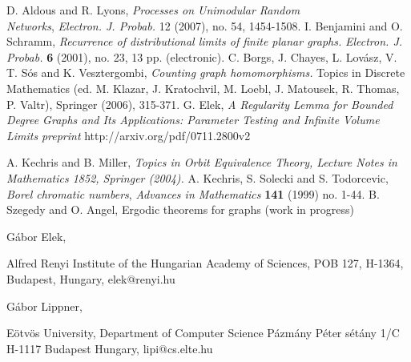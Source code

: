 \documentclass{article}
\begin{document}
\begin{thebibliography}{99} 
 {\sc D. Aldous and R. Lyons}, {\em 
Processes on Unimodular Random \\
Networks}, {\sl  Electron. J. Probab.}  12  (2007), no. 54, 1454-1508.
 {\sc I. Benjamini and O. Schramm},
{\em Recurrence of distributional limits of finite planar graphs.}
{\sl Electron. J. Probab.} {\bf 6} (2001), no. 23, 13 pp. (electronic).
 {\sc C. Borgs, J. Chayes, L. Lov\'asz, V. T. S\'os and
K. Vesztergombi},
{\em Counting graph homomorphisms.}
 Topics in Discrete Mathematics  (ed. M. Klazar, J. Kratochvil, M. Loebl, 
J. Matousek, R. Thomas, P. Valtr), Springer (2006), 315-371.
 {\sc G. Elek},
{\em A Regularity Lemma for Bounded Degree Graphs and Its Applications:
Parameter Testing and Infinite Volume Limits}
{\sl preprint} http://arxiv.org/pdf/0711.2800v2

 {\sc A. Kechris and B. Miller},
{\em Topics in Orbit Equivalence Theory, Lecture Notes in Mathematics 1852,
Springer (2004).}
 {\sc A. Kechris, S. Solecki and S. Todorcevic},
{\em Borel chromatic numbers},
{\sl Advances in Mathematics} {\bf 141} (1999) no. 1-44.
 {\sc B. Szegedy and O. Angel},
Ergodic theorems for graphs (work in progress)

\end{thebibliography}
G\'abor Elek,

\noindent
Alfred Renyi Institute of the Hungarian Academy of Sciences,
\noindent
POB 127, H-1364, Budapest, Hungary,  elek@renyi.hu



\vskip 0.2in

\noindent
G\'abor Lippner,

\noindent
E\"otv\"os University, Department of Computer Science
\noindent
P\'azm\'any P\'eter s\'et\'any 1/C
H-1117 Budapest
Hungary, lipi@cs.elte.hu
\end{document}
